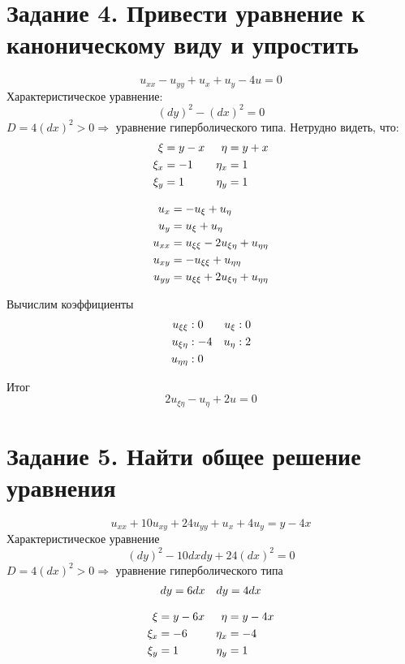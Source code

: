 \documentclass[a4paper,12pt]{article}
\begin{document}
\section{Задание 4. Привести уравнение к каноническому виду и упростить}
$$u_{xx} - u_{yy} + u_x + u_y - 4u = 0$$
Характеристическое уравнение:
$$(dy)^2 - (dx)^2 = 0$$
$D = 4(dx)^2 > 0 \Rightarrow$ уравнение гиперболического типа.
Нетрудно видеть, что: 
\begin{align}
\xi &= y-x &\eta &= y+x \notag \\
\xi_x &= -1 &\eta_x &= 1 \notag \\
\xi_y &= 1 &\eta_y &= 1 \notag 
\end{align}

\begin{align}
u_x &= -u_\xi + u_\eta \notag \\
u_y &= u_\xi + u_\eta \notag \\
u_{xx} &= u_{\xi\xi} - 2u_{\xi\eta} + u_{\eta\eta} \notag \\
u_{xy} &= -u_{\xi\xi} + u_{\eta\eta} \notag \\
u_{yy} &= u_{\xi\xi} + 2u_{\xi\eta} + u_{\eta\eta} \notag
\end{align}

Вычислим коэффициенты
\begin{align}
    u_{\xi\xi} &: 0 &u_\xi &: 0 \notag \\
    u_{\xi\eta} &: -4 &u_\eta &: 2 \notag \\
    u_{\eta\eta} &: 0 \notag
\end{align}

Итог
$$2u_{\xi\eta} - u_\eta + 2u = 0$$

\section{Задание 5. Найти общее решение уравнения}
$$u_{xx} + 10u_{xy} + 24u_{yy} + u_x + 4u_y = y-4x$$
Характеристическое уравнение
$$(dy)^2 - 10dxdy + 24(dx)^2 = 0$$
$D = 4(dx)^2 > 0 \Rightarrow$ уравнение гиперболического типа
\begin{align}
dy &= 6dx &dy = 4dx \notag
\end{align}

\begin{align}
\xi &= y - 6x &\eta &= y-4x \notag \\
\xi_x &= -6 &\eta_x &= -4 \notag \\
\xi_y &= 1 &\eta_y &= 1 \notag
\end{align}
\end{document}
